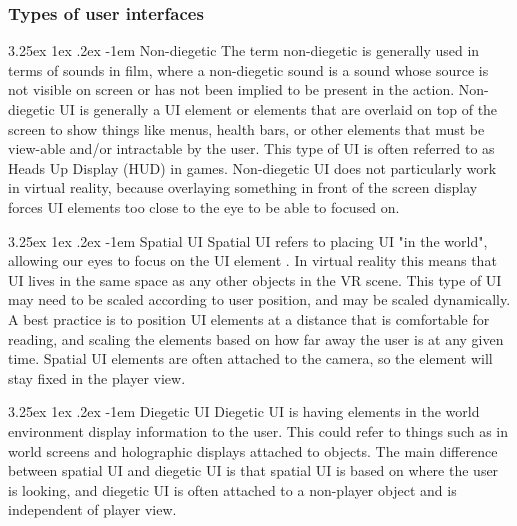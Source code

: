 \documentclass[onecolumn, draftclsnofoot,10pt, compsoc]{IEEEtran}
\makeatletter
\renewcommand\paragraph{\@startsection{paragraph}{5}{\z@}%
  {3.25ex \@plus1ex \@minus.2ex}%
  {-1em}%
  {\normalfont\normalsize\bfseries}}
\makeatother
\begin{document}
\subsubsection{Types of user interfaces}

\paragraph{Non-diegetic}
The term non-diegetic is generally used in terms of sounds in film, where a non-diegetic sound is a sound whose source is not visible on screen or has not been implied to be present in the action. Non-diegetic UI is generally a UI element or elements that are overlaid on top of the screen to show things like menus, health bars, or other elements that must be view-able and/or intractable by the user. This type of UI is often referred to as Heads Up Display (HUD) in games. Non-diegetic UI does not particularly work in virtual reality, because overlaying something in front of the screen display forces UI elements too close to the eye to be able to focused on.    

\paragraph{Spatial UI}
Spatial UI refers to placing UI "in the world", allowing our eyes to focus on the UI element \cite{unity}. In virtual reality this means that UI lives in the same space as any other objects in the VR scene. This type of UI may need to be scaled according to user position, and may be scaled dynamically. A best practice is to position UI elements at a distance that is comfortable for reading, and scaling the elements based on how far away the user is at any given time. Spatial UI elements are often attached to the camera, so the element will stay fixed in the player view.

\paragraph{Diegetic UI}
Diegetic UI is having elements in the world environment display information to the user. This could refer to things such as in world screens and holographic displays attached to objects. The main difference between spatial UI and diegetic UI is that spatial UI is based on where the user is looking, and diegetic UI is often attached to a non-player object and is independent of player view.  
\end{document}
